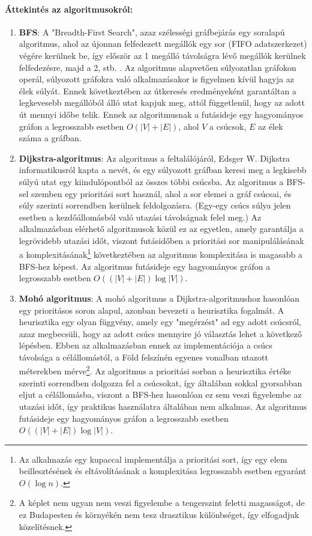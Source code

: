 \paragraph{Áttekintés az algoritmusokról:}
\begin{enumerate}
	\item \textbf{BFS}: A "Breadth-First Search", azaz szélességi gráfbejárás egy soralapú algoritmus, ahol az újonnan felfedezett megállók egy sor (FIFO adatszerkezet) végére kerülnek be, így először az 1 megálló távolságra lévő megállók kerülnek felfedezésre, majd a 2, stb. . Az algoritmus alapvetően súlyozatlan gráfokon operál, súlyozott gráfokra való alkalmazásakor is figyelmen kívül hagyja az élek súlyát. Ennek következtében az útkeresés eredményeként garantáltan a legkevesebb megállóból álló utat kapjuk meg, attól függetlenül, hogy az adott út mennyi időbe telik. Ennek az algoritmusnak a futásideje egy hagyományos gráfon a legrosszabb esetben $O(|V| + |E|)$, ahol $V$ a csúcsok, $E$ az élek száma a gráfban.
	\item \textbf{Dijkstra-algoritmus}: Az algoritmus a feltalálójáról, Edsger W. Dijkstra informatikusról kapta a nevét, és egy súlyozott gráfban keresi meg a legkisebb súlyú utat egy kiindulópontból az összes többi csúcsba. Az algoritmus a BFS-sel szemben egy prioritási sort használ, ahol a sor elemei a gráf csúcsai, és súly szerinti sorrendben kerülnek feldolgozásra. (Egy-egy csúcs súlya jelen esetben a kezdőállomásból való utazási távolságnak felel meg.) Az alkalmazásban elérhető algoritmusok közül ez az egyetlen, amely garantálja a legrövidebb utazási időt, viszont futásidőben a prioritási sor manipulálásának a komplexitásának\footnote{Az alkalmazás egy kupaccal implementálja a prioritási sort, így egy elem beillesztésének és eltávolításának a komplexitása legrosszabb esetben egyaránt $O(\log n)$.} következtében az algoritmus komplexitása is magasabb a BFS-hez képest. Az algoritmus futásideje egy hagyományos gráfon a legrosszabb esetben $O((|V| + |E|) \log |V|)$.
	\item \textbf{Mohó algoritmus}: A mohó algoritmus a Dijkstra-algoritmushoz hasonlóan egy prioritásos soron alapul, azonban bevezeti a heurisztika fogalmát. A heurisztika egy olyan függvény, amely egy "megérzést" ad egy adott csúcsról, azaz megbecsüli, hogy az adott csúcs mennyire jó választás lehet a következő lépésben. Ebben az alkalmazásban ennek az implementációja a csúcs távolsága a célállomástól, a Föld felszínén egyenes vonalban utazott méterekben mérve\footnote{A képlet nem ugyan nem veszi figyelembe a tengerszint feletti magasságot, de ez Budapesten és környékén nem tesz drasztikus különbséget, így elfogadjuk közelítésnek.}. Az algoritmus a prioritási sorban a heurisztika értéke szerinti sorrendben dolgozza fel a csúcsokat, így általában sokkal gyorsabban eljut a célállomásba, viszont a BFS-hez hasonlóan ez sem veszi figyelembe az utazási időt, így praktikus használatra általában nem alkalmas. Az algoritmus futásideje egy hagyományos gráfon a legrosszabb esetben $O((|V| + |E|) \log |V|)$.

\end{enumerate}
